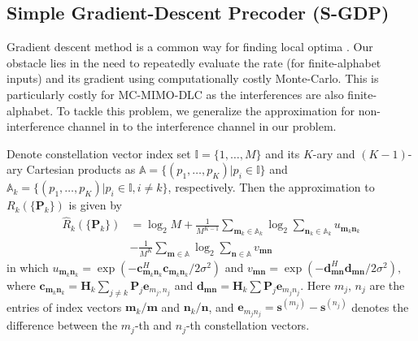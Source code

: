 \documentclass{article}
\begin{document}
    \subsection{Simple Gradient-Descent Precoder (S-GDP)}
    \label{ssec:SGDP}
    \vspace*{-2mm}

    Gradient descent method is a common way for finding local optima \cite{boyd2004convex}.
Our obstacle lies in the need to repeatedly evaluate the rate (for finite-alphabet inputs) and its gradient using
    computationally costly Monte-Carlo. This is particularly costly for MC-MIMO-DLC as the interferences are also finite-alphabet.
    To tackle this problem, we generalize the approximation for non-interference channel in \cite{zeng2012low} to the interference channel in our problem.

    Denote constellation vector index set $\mathbb{I}=\{1,\ldots,M\}$ and its $K$-ary and $(K-1)$-ary Cartesian products as $\mathbb{A}=\{(p_1,\ldots,p_K)|p_i\in\mathbb{I}\}$ and $\mathbb{A}_k=\{(p_1,\ldots,p_K)|p_i\in\mathbb{I},i\not=k\}$, respectively. Then the approximation to $R_k(\{\mathbf{P}_k\})$ is given by
    \begin{align}
        \hat{R}_k(\{\mathbf{P}_k\}) & = \log_2M + \frac{1}{M^{K-1}} \sum_{\mathbf{m}_k\in \mathbb{A}_k}\log_2\sum_{\mathbf{n}_k\in \mathbb{A}_k}u_{\mathbf{m}_k\mathbf{n}_k}
        \nonumber\\
                                    & - \frac{1}{M^K}\sum_{\mathbf{m}\in \mathbb{A}}\log_2\sum_{\mathbf{n}\in \mathbb{A}}v_{\mathbf{m}\mathbf{n}}
        \label{eq:ARSGDP}
    \end{align}
    in which
$u_{\mathbf{m}_k\mathbf{n}_k}=\exp(-\mathbf{c}_{\mathbf{m}_k\mathbf{n}_k}^H\mathbf{c}_{\mathbf{m}_k\mathbf{n}_k}/2\sigma^2)$
and
$
 v_{\mathbf{m}\mathbf{n}}=\exp(-\mathbf{d}_{\mathbf{m}\mathbf{n}}^H\mathbf{d}_{\mathbf{m}\mathbf{n}}/2\sigma^2),
$    where $\mathbf{c}_{\mathbf{m}_k\mathbf{n}_k}=\mathbf{H}_k\sum_{j\not=k}\mathbf{P}_j\mathbf{e}_{m_j,n_j}$ and $\mathbf{d}_{\mathbf{m}\mathbf{n}}=\mathbf{H}_k\sum\mathbf{P}_j\mathbf{e}_{m_jn_j}$.
    Here $m_j,\,n_j$ are the entries of index vectors $\mathbf{m}_k/\mathbf{m}$ and ${\mathbf{n}_k/\mathbf{n}}$, and $\mathbf{e}_{m_jn_j} = \mathbf{s}^{(m_j)}-\mathbf{s}^{(n_j)}$ denotes the difference between the $m_j$-th and $n_j$-th constellation vectors.
\end{document}
